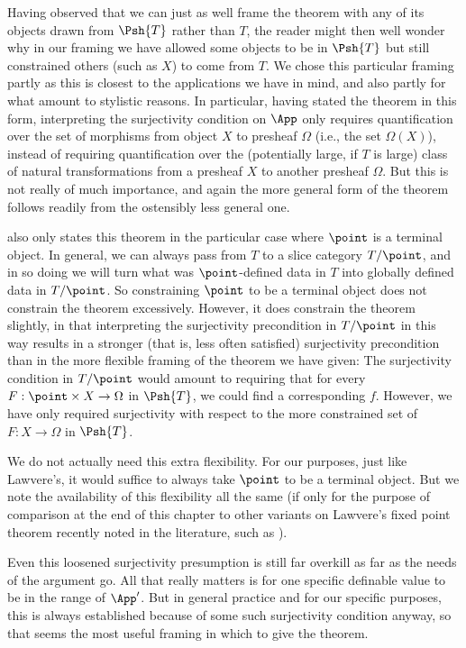 Having observed that we can just as well frame the theorem with any of its objects drawn from $\Psh{T}$ rather than $T$, the reader might then well wonder why in our framing we have allowed some objects to be in $\Psh{T}$ but still constrained others (such as $X$) to come from $T$. We chose this particular framing partly as this is closest to the applications we have in mind, and also partly for what amount to stylistic reasons. In particular, having stated the theorem in this form, interpreting the surjectivity condition on $\App$ only requires quantification over the set of morphisms from object $X$ to presheaf $\Omega$ (i.e., the set $\Omega(X)$), instead of requiring quantification over the (potentially large, if $T$ is large) class of natural transformations from a presheaf $X$ to another presheaf $\Omega$. But this is not really of much importance, and again the more general form of the theorem follows readily from the ostensibly less general one.

\autocite{lawvere1969diagonal} also only states this theorem in the particular case where $\point$ is a terminal object. In general, we can always pass from $T$ to a slice category $T/\point$, and in so doing we will turn what was $\point$-defined data in $T$ into globally defined data in $T/\point$. So constraining $\point$ to be a terminal object does not constrain the theorem excessively. However, it does constrain the theorem slightly, in that interpreting the surjectivity precondition in $T/\point$ in this way results in a stronger (that is, less often satisfied) surjectivity precondition than in the more flexible framing of the theorem we have given: The surjectivity condition in $T/\point$ would amount to requiring that for every $F : \point \times X \to \Omega$ in $\Psh{T}$, we could find a corresponding $f$. However, we have only required surjectivity with respect to the more constrained set of $F : X \to \Omega$ in $\Psh{T}$.

We do not actually need this extra flexibility. For our purposes, just like Lawvere's, it would suffice to always take $\point$ to be a terminal object. But we note the availability of this flexibility all the same (if only for the purpose of comparison at the end of this chapter to other variants on Lawvere's fixed point theorem recently noted in the literature, such as ).

Even this loosened surjectivity presumption is still far overkill as far as the needs of the argument go. All that really matters is for one specific definable value to be in the range of $\App'$. But in general practice and for our specific purposes, this is always established because of some such surjectivity condition anyway, so that seems the most useful framing in which to give the theorem.

